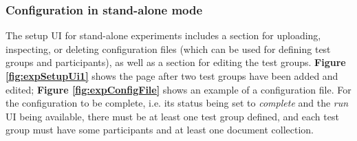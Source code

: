\documentclass[fleqn]{article}
\begin{document}
\subsubsection{Configuration in stand-alone mode}

The setup UI for stand-alone experiments includes a section for uploading, inspecting, or deleting configuration files (which can be used for
defining test groups and participants), as well as a section for editing the test groups. \textbf{Figure \ref{fig:expSetupUi1}}
shows the page after two test groups have been added and edited; \textbf{Figure \ref{fig:expConfigFile}} shows an example of a configuration file. 
For the configuration to be complete, i.e. its status being set to 
\emph{complete} and the \emph{run} UI being available, there must be at least one test group defined, and each test group must 
have some participants and at least one document collection.
\end{document}
